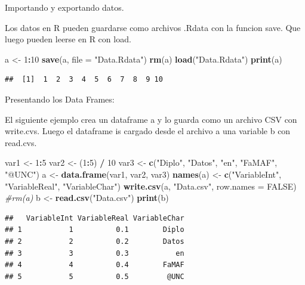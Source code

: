 \documentclass[ignorenonframetext,]{beamer}
\newenvironment{Shaded}{\begin{snugshade}}{\end{snugshade}}
\newcommand{\KeywordTok}[1]{\textcolor[rgb]{0.13,0.29,0.53}{\textbf{#1}}}
\newcommand{\DataTypeTok}[1]{\textcolor[rgb]{0.13,0.29,0.53}{#1}}
\newcommand{\DecValTok}[1]{\textcolor[rgb]{0.00,0.00,0.81}{#1}}
\newcommand{\StringTok}[1]{\textcolor[rgb]{0.31,0.60,0.02}{#1}}
\newcommand{\CommentTok}[1]{\textcolor[rgb]{0.56,0.35,0.01}{\textit{#1}}}
\newcommand{\OtherTok}[1]{\textcolor[rgb]{0.56,0.35,0.01}{#1}}
\newcommand{\OperatorTok}[1]{\textcolor[rgb]{0.81,0.36,0.00}{\textbf{#1}}}
\newcommand{\NormalTok}[1]{#1}
\begin{document}
\begin{frame}[fragile]
\end{frame}

\begin{frame}[fragile]{Importando y exportando datos.}

Los datos en R pueden guardarse como archivos .Rdata con la funcion
save. Que luego pueden leerse en R con load.

\begin{Shaded}
\begin{Highlighting}[]
\NormalTok{a <-}\StringTok{ }\DecValTok{1}\OperatorTok{:}\DecValTok{10}
\KeywordTok{save}\NormalTok{(a, }\DataTypeTok{file =} \StringTok{"Data.Rdata"}\NormalTok{)}
\KeywordTok{rm}\NormalTok{(a)}
\KeywordTok{load}\NormalTok{(}\StringTok{"Data.Rdata"}\NormalTok{)}
\KeywordTok{print}\NormalTok{(a)}
\end{Highlighting}
\end{Shaded}

\begin{verbatim}
##  [1]  1  2  3  4  5  6  7  8  9 10
\end{verbatim}

\end{frame}

\begin{frame}[fragile]{Presentando los Data Frames:}

El siguiente ejemplo crea un dataframe a y lo guarda como un archivo CSV
con write.cvs. Luego el dataframe is cargado desde el archivo a una
variable b con read.cvs.

\begin{Shaded}
\begin{Highlighting}[]
\NormalTok{var1 <-}\StringTok{ }\DecValTok{1}\OperatorTok{:}\DecValTok{5}
\NormalTok{var2 <-}\StringTok{ }\NormalTok{(}\DecValTok{1}\OperatorTok{:}\DecValTok{5}\NormalTok{) }\OperatorTok{/}\StringTok{ }\DecValTok{10}
\NormalTok{var3 <-}\StringTok{ }\KeywordTok{c}\NormalTok{(}\StringTok{"Diplo"}\NormalTok{, }\StringTok{"Datos"}\NormalTok{, }\StringTok{"en"}\NormalTok{, }\StringTok{"FaMAF"}\NormalTok{, }\StringTok{"@UNC"}\NormalTok{)}
\NormalTok{a <-}\StringTok{ }\KeywordTok{data.frame}\NormalTok{(var1, var2, var3)}
\KeywordTok{names}\NormalTok{(a) <-}\StringTok{ }\KeywordTok{c}\NormalTok{(}\StringTok{"VariableInt"}\NormalTok{, }\StringTok{"VariableReal"}\NormalTok{, }\StringTok{"VariableChar"}\NormalTok{)}
\KeywordTok{write.csv}\NormalTok{(a, }\StringTok{"Data.csv"}\NormalTok{, }\DataTypeTok{row.names =} \OtherTok{FALSE}\NormalTok{)}
 \CommentTok{#rm(a)}
\NormalTok{b <-}\StringTok{ }\KeywordTok{read.csv}\NormalTok{(}\StringTok{"Data.csv"}\NormalTok{)}
\KeywordTok{print}\NormalTok{(b)}
\end{Highlighting}
\end{Shaded}

\begin{verbatim}
##   VariableInt VariableReal VariableChar
## 1           1          0.1        Diplo
## 2           2          0.2        Datos
## 3           3          0.3           en
## 4           4          0.4        FaMAF
## 5           5          0.5         @UNC
\end{verbatim}

\end{frame}
\end{document}
